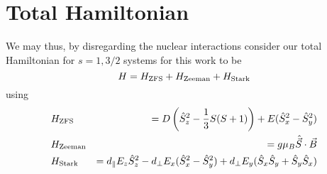 \section{Total Hamiltonian}
We may thus, by disregarding the nuclear interactions consider our total Hamiltonian for $s=1, 3/2$ systems for this work to be 
\begin{equation}
   H = H_{\ce{ZFS}} + H_{\ce{Zeeman}} + H_{\ce{Stark}}
    \label{eq:total_hamiltonian}
\end{equation}
using 
\begin{eqnarray}
    &H_{\ce{ZFS}} &=  D\left(\hat{S}_z^2 - \frac{1}{3}S(S+1)\right)  + E(\hat{S}_x^2 - \hat{S}_y^2)\label{H_ZFS}\\ 
    &H_{\ce{Zeeman}} &= g \mu_B \hat{\vec{S}}\cdot \vec{B} \label{H_Zeeman}\\ 
    &H_{\ce{Stark}} &= d_\parallel E_z \hat{S}_z^2 - d_\perp E_x (\hat{S}_x^2 - \hat{S}_y^2) + d_\perp E_y (\hat{S}_x\hat{S}_y + \hat{S}_y \hat{S}_x) \label{H_Stark}
\end{eqnarray}


